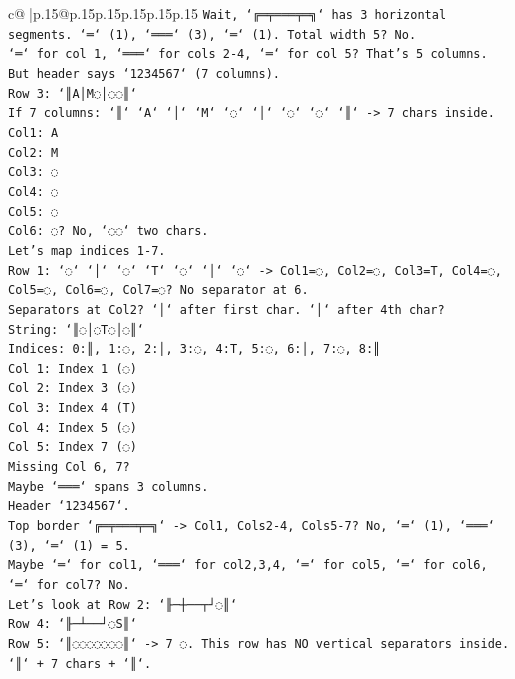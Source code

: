 \documentclass{article}
\begin{document}
{\begin{supertabular}{c@{$\;$}|p{.15\linewidth}@{}p{.15\linewidth}p{.15\linewidth}p{.15\linewidth}p{.15\linewidth}p{.15\linewidth}}
{{{\texttt{Wait, `╔═╤═══╤═╗` has 3 horizontal segments. `═` (1), `═══` (3), `═` (1). Total width 5? No.} \\
\texttt{`═` for col 1, `═══` for cols 2{-}4, `═` for col 5? That's 5 columns.} \\
\texttt{But header says `1234567` (7 columns).} \\
\texttt{Row 3: `║A│M◌│◌◌║`} \\
\texttt{If 7 columns: `║` `A` `│` `M` `◌` `│` `◌` `◌` `║` {-}> 7 chars inside.} \\
\texttt{Col1: A} \\
\texttt{Col2: M} \\
\texttt{Col3: ◌} \\
\texttt{Col4: ◌} \\
\texttt{Col5: ◌} \\
\texttt{Col6: ◌? No, `◌◌` two chars.} \\
\texttt{Let's map indices 1{-}7.} \\
\texttt{Row 1: `◌` `│` `◌` `T` `◌` `│` `◌` {-}> Col1=◌, Col2=◌, Col3=T, Col4=◌, Col5=◌, Col6=◌, Col7=◌? No separator at 6.} \\
\texttt{Separators at Col2? `│` after first char. `│` after 4th char?} \\
\texttt{String: `║◌│◌T◌│◌║`} \\
\texttt{Indices: 0:║, 1:◌, 2:│, 3:◌, 4:T, 5:◌, 6:│, 7:◌, 8:║} \\
\texttt{Col 1: Index 1 (◌)} \\
\texttt{Col 2: Index 3 (◌)} \\
\texttt{Col 3: Index 4 (T)} \\
\texttt{Col 4: Index 5 (◌)} \\
\texttt{Col 5: Index 7 (◌)} \\
\texttt{Missing Col 6, 7?} \\
\texttt{Maybe `═══` spans 3 columns.} \\
\texttt{Header `1234567`.} \\
\texttt{Top border `╔═╤═══╤═╗` {-}> Col1, Cols2{-}4, Cols5{-}7? No, `═` (1), `═══` (3), `═` (1) = 5.} \\
\texttt{Maybe `═` for col1, `═══` for col2,3,4, `═` for col5, `═` for col6, `═` for col7? No.} \\
\texttt{Let's look at Row 2: `╟─┼──┬┘◌║`} \\
\texttt{Row 4: `╟─┴──┘◌S║`} \\
\texttt{Row 5: `║◌◌◌◌◌◌◌║` {-}> 7 ◌. This row has NO vertical separators inside. `║` + 7 chars + `║`.} \\
}}}
\end{supertabular}}
\end{document}
